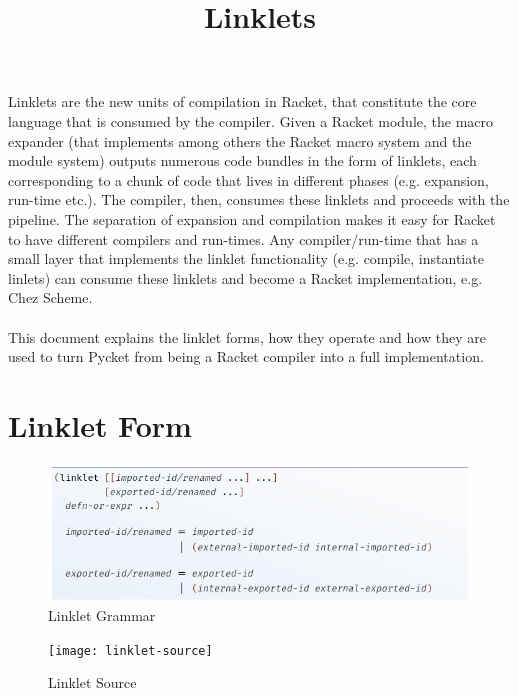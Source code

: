 \documentclass[a4paper]{article}
\title{Linklets}
\author{}
\date{}
\begin{document}
\maketitle

\paragraph{} Linklets are the new units of compilation in Racket, that
constitute the core language that is consumed by the compiler. Given a
Racket module, the macro expander (that implements among others the
Racket macro system and the module system) outputs numerous code
bundles in the form of linklets, each corresponding to a chunk of code
that lives in different phases (e.g. expansion, run-time etc.). The
compiler, then, consumes these linklets and proceeds with the
pipeline. The separation of expansion and compilation makes it easy
for Racket to have different compilers and run-times. Any
compiler/run-time that has a small layer that implements the linklet
functionality (e.g. compile, instantiate linlets) can consume these
linklets and become a Racket implementation, e.g. Chez Scheme.
\cite{racketcs-icfp-2019}

\paragraph{} This document explains the linklet forms, how they
operate and how they are used to turn Pycket from being a Racket
compiler into a full implementation.

\section{Linklet Form}

\begin{figure}[h!]
\includegraphics[scale=0.5]{img/linklet-grammar.png}
\caption{Linklet Grammar}
\label{fig:linklet-grammar}
\end{figure}


\begin{figure}[h!]
\begin{center}
\texttt{[image: linklet-source]}
\caption{Linklet Source}
\end{center}
\end{figure}
\end{document}
